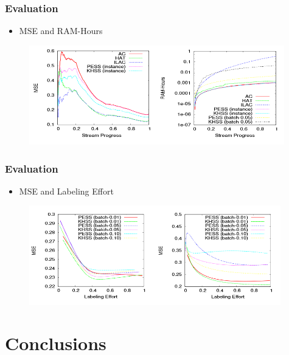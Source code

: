 \documentclass[14pt]{beamer}
\begin{document}
\begin{frame}\frametitle{Evaluation}

\begin{itemize}
\item MSE and RAM-Hours
\end{itemize}

\begin{figure}
\centering
\includegraphics[height=1.70in]{results3}
\end{figure}

\end{frame}

\begin{frame}\frametitle{Evaluation}

\begin{itemize}
\item MSE and Labeling Effort
\end{itemize}

\begin{figure}
\centering
\includegraphics[height=1.70in]{results2}
\end{figure}

\end{frame}


\section{Conclusions}
\end{document}
